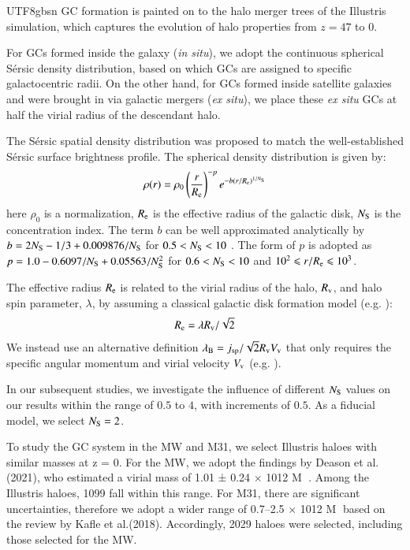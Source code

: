 \documentclass[trackchanges, twocolappendix, twocolumn]{aastex701}
\begin{document}
\begin{CJK*}{UTF8}{gbsn}
GC formation is painted on to the halo merger trees of the Illustris simulation, which captures the evolution of halo properties from $z = 47$ to 0.

For GCs formed inside the galaxy (\textit{in situ}), we adopt the continuous spherical S{\'e}rsic density distribution, based on which GCs are assigned to specific galactocentric radii. On the other hand, for GCs formed inside satellite galaxies and were brought in via galactic mergers (\textit{ex situ}), we place these \textit{ex situ} GCs at half the virial radius of the descendant halo.

The S{\'e}rsic spatial density distribution was proposed to match the well-established S{\'e}rsic surface brightness profile. The spherical density distribution is given by:
\begin{align}\label{eq:sersic}
\rho (r) = \rho_0 \left( \dfrac{r}{R_{\rm e}} \right)^{-p} e^{-b (r / R_{\rm e})^{1 / N_{\rm S}}}
\end{align}
here $\rho_0$ is a normalization, $R_{\rm e}$ is the effective radius of the galactic disk, $N_{\rm S}$ is the concentration index. The term $b$ can be well approximated analytically by $b = 2 N_{\rm S} - 1 / 3 + 0.009876 / N_{\rm S}$ for $0.5 < N_{\rm S} < 10$ \citep{1997A&A...321..111P}. The form of $p$ is adopted as $p = 1.0 - 0.6097 / N_{\rm S} + 0.05563 / N_{\rm S}^2$ for $0.6 < N_{\rm S} < 10$ and $10^2 \leqslant r / R_{\rm e} \leqslant 10^3$.

The effective radius $R_{\rm e}$ is related to the virial radius of the halo, $R_{\rm v}$, and halo spin parameter, $\lambda$, by assuming a classical galactic disk formation model (e.g. \cite{1998MNRAS.295..319M}):
\begin{align}
R_{\rm e} = \lambda R_{\rm v} / \sqrt{2}
\end{align}
We instead use an alternative definition $\lambda_{\rm B} = j_{\rm sp} / \sqrt{2} R_{\rm v} V_{\rm v}$ that only requires the specific angular momentum and virial velocity $V_{\rm v}$ (e.g. \cite{2001ApJ...555..240B}).

In our subsequent studies, we investigate the influence of different $N_{\rm S}$ values on our results within the range of $0.5$ to $4$, with increments of $0.5$. As a fiducial model, we select $N_{\rm S} = 2$.

To study the GC system in the MW and M31, we select Illustris haloes with similar masses at z = 0. For the MW, we adopt the findings by Deason et al. (2021), who estimated a virial mass of 1.01 ± 0.24 × 1012 M . Among the Illustris haloes, 1099 fall within this range. For M31, there are significant uncertainties, therefore we adopt a wider range of 0.7–2.5 × 1012 M based on the review by Kafle et al.(2018). Accordingly, 2029 haloes were selected, including those selected for the MW.


\end{CJK*}
\end{document}
